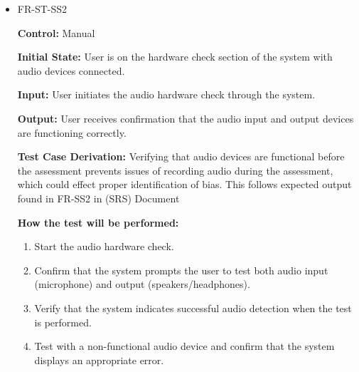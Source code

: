 \documentclass[12pt, titlepage]{article}
\begin{document}
\begin{itemize}
  \item FR-ST-SS2
    \begin{mdframed}[linewidth=0.5mm]
      \textbf{Control:} Manual \par
      \textbf{Initial State:} User is on the hardware check section of the system with audio devices connected. \par
      \textbf{Input:} User initiates the audio hardware check through the system. \par
      \textbf{Output:} User receives confirmation that the audio input and output devices are functioning correctly. \par
      \textbf{Test Case Derivation:} Verifying that audio devices are functional before the assessment prevents issues of recording audio during
      the assessment, which could effect proper identification of bias. This follows expected output found in FR-SS2 in (SRS) Document\par
      \textbf{How the test will be performed:}
      \begin{enumerate}[noitemsep]
        \item Start the audio hardware check.
        \item Confirm that the system prompts the user to test both audio input (microphone) and output (speakers/headphones).
        \item Verify that the system indicates successful audio detection when the test is performed.
        \item Test with a non-functional audio device and confirm that the system displays an appropriate error.
      \end{enumerate}
    \end{mdframed}


\end{itemize}
\end{document}
